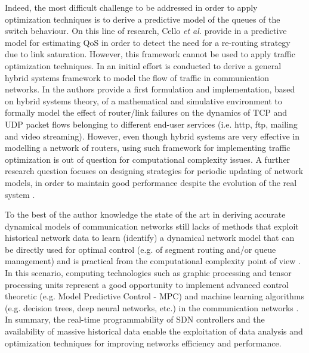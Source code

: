 Indeed, the most difficult challenge to be addressed in order to apply optimization techniques is to derive a predictive model of the queues of the switch behaviour. On this line of research, Cello \textit{et al.} provide in \cite{Cello2016} a predictive model for estimating QoS in order to detect the need for a re-routing strategy due to link saturation. However, this framework cannot be used to apply traffic optimization techniques. In \cite{LeeIEEEToN2007} an initial effort is conducted to derive a general hybrid systems framework to model the flow of traffic in communication networks. In \cite{DiBenedetto2014} the authors provide a first formulation and implementation, based on hybrid systems theory, of a mathematical and simulative environment to formally model the effect of router/link failures on the dynamics of TCP and UDP packet flows belonging to different end-user services (i.e. http, ftp, mailing and video streaming). However, even though hybrid systems are very effective in modelling a network of routers, using such framework for implementing traffic optimization is out of question for computational complexity issues. A further research question focuses on designing strategies for periodic updating of network models, in order to maintain good performance despite the evolution of the real system \cite{Mulinka2018}.

To the best of the author knowledge the state of the art in deriving accurate dynamical models of communication networks still lacks of methods that exploit historical network data to learn (identify) a dynamical network model that can be directly used for optimal control (e.g. of segment routing and/or queue management) and is practical from the computational complexity point of view \cite{Neely2010,Lemeshko2019,Kim2019,Aljoby2019,Lebedenko2018,Le2007,SouravGhosh2005}. In this scenario, computing technologies such as graphic processing and tensor processing units represent a good opportunity to implement advanced control theoretic (e.g. Model Predictive Control - MPC) and machine learning algorithms (e.g. decision trees, deep neural networks, etc.) in the communication networks \cite{Wang2018, Usama2017, Xie2019, Xu2018}. In summary, the real-time programmability of SDN controllers and the availability of massive historical data enable the exploitation of data analysis and optimization techniques for improving networks efficiency and performance.

